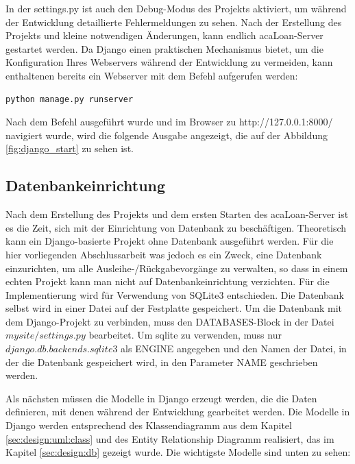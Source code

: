 In der settings.py ist auch den Debug-Modus des Projekts aktiviert, um während der Entwicklung detaillierte Fehlermeldungen zu sehen.  Nach der Erstellung des Projekts und kleine notwendigen Änderungen, kann endlich acaLoan-Server gestartet werden. Da Django einen praktischen Mechanismus bietet, um die Konfiguration Ihres Webservers während der Entwicklung zu vermeiden, kann enthaltenen bereits ein Webserver mit dem Befehl aufgerufen werden: 
\begin{lstlisting}[caption={[runserver-Befehl] },captionpos=b]
python manage.py runserver
\end{lstlisting}
Nach dem Befehl ausgeführt wurde und im Browser zu http://127.0.0.1:8000/ navigiert wurde, wird die folgende Ausgabe angezeigt, die auf der Abbildung \ref{fig:django_start} zu sehen ist.
 
\subsection{Datenbankeinrichtung}
\label{sec:server:database}
Nach dem Erstellung des Projekts und dem ersten Starten des acaLoan-Server ist es die Zeit, sich mit der Einrichtung von Datenbank zu beschäftigen. Theoretisch kann ein Django-basierte Projekt ohne Datenbank ausgeführt werden. Für die hier vorliegenden Abschlussarbeit was jedoch es ein Zweck, eine Datenbank einzurichten, um alle Ausleihe-/Rückgabevorgänge zu verwalten, so dass in einem echten Projekt kann man nicht auf Datenbankeinrichtung verzichten. Für die Implementierung wird für Verwendung von SQLite3 entschieden. Die Datenbank selbst wird in einer Datei auf der Festplatte gespeichert. Um die Datenbank mit dem Django-Projekt zu verbinden, muss den DATABASES-Block in der Datei $mysite/settings.py$ bearbeitet. Um sqlite zu verwenden, muss nur $django.db.backends.sqlite3$ als ENGINE angegeben und den Namen der Datei, in der die Datenbank gespeichert wird, in den Parameter NAME geschrieben werden\cite{website:15}.

Als nächsten müssen die Modelle in Django erzeugt werden, die die Daten definieren, mit denen während der Entwicklung gearbeitet werden. Die Modelle in Django werden entsprechend des Klassendiagramm aus dem Kapitel \ref{sec:design:uml:class} und des Entity Relationship Diagramm realisiert, das im Kapitel \ref{sec:design:db} gezeigt wurde. Die wichtigste Modelle sind unten zu sehen:

